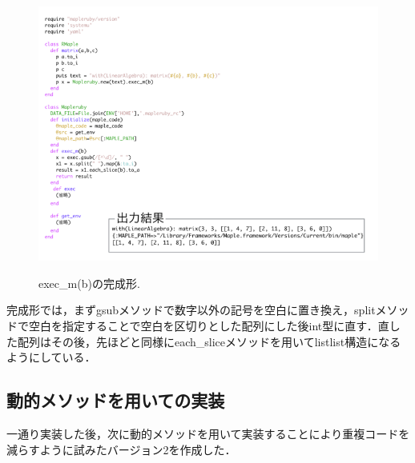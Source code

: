 \begin{figure}[htbp]\begin{center}
\includegraphics[width=12cm,bb= 0 0 937 753]{../figs/./mapleruby_eringi.005.png}
\caption{exec\_m(b)の完成形.}
\label{figure:three}
\label{default}\end{center}\end{figure}
完成形では，まずgsubメソッドで数字以外の記号を空白に置き換え，splitメソッドで空白を指定することで空白を区切りとした配列にした後int型に直す．直した配列はその後，先ほどと同様にeach\_sliceメソッドを用いてlistlist構造になるようにしている．
\newpage

\subsection{動的メソッドを用いての実装}
一通り実装した後，次に動的メソッドを用いて実装することにより重複コードを減らすように試みたバージョン2を作成した．

